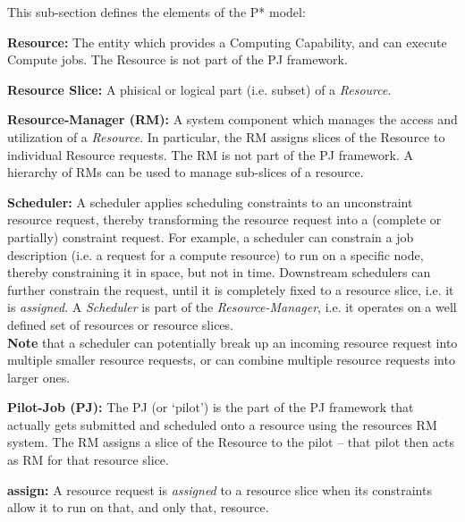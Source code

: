 \documentclass[conference,final]{IEEEtran}
\begin{document}
\noindent
This sub-section defines the elements of the P* model:

\begin{compactitem}

\item \textbf{Resource:} The entity which provides a Computing
Capability, and can execute Compute jobs.  The Resource is not part of
the PJ framework.

\item \textbf{Resource Slice:} A phisical or logical part (i.e.
subset) of a \emph{Resource}.

\item \textbf{Resource-Manager (RM):} A system component which manages
the access and utilization of a \emph{Resource}.  In particular, the
RM assigns slices of the Resource to individual Resource requests.
The RM is not part of the PJ framework.  A hierarchy of RMs can be
used to manage sub-slices of a resource.

\item\textbf{Scheduler:} A scheduler applies scheduling constraints to
an unconstraint resource request, thereby transforming the resource
request into a (complete or partially) constraint request.  For
example, a scheduler can constrain a job description (i.e. a
request for a compute resource) to run on a specific node, thereby 
constraining it in space, but not in time.  Downstream schedulers can
further constrain the request, until it is completely fixed to a
resource slice, i.e. it is \emph{assigned}.  A \emph{Scheduler} is part
of the \emph{Resource-Manager}, i.e. it operates on a well defined set 
of resources or resource slices.\\
\textbf{Note} that a scheduler can potentially break up an incoming resource
request into multiple smaller resource requests, or can combine
multiple resource requests into larger ones.

\item \textbf{Pilot-Job (PJ):} The PJ (or `pilot') is
  the part of the PJ framework that actually gets submitted and 
  scheduled onto a resource using the resources RM system.  The 
  RM assigns a slice of the Resource to the pilot -- that pilot 
  then acts as RM for that resource slice.  

\item \textbf{assign:} A resource request is \emph{assigned} to a
resource slice when its constraints allow it to run on that, and only
that, resource.


\end{compactitem}
\end{document}
